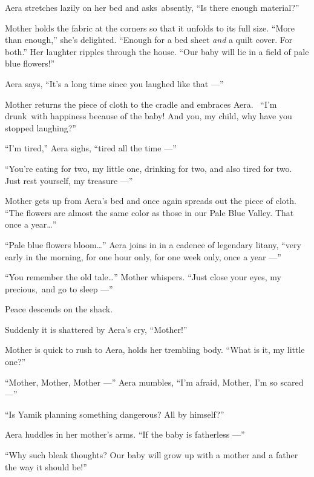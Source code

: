 \documentclass[twoside,11pt,openany]{book}
\begin{document}
Aera stretches lazily on her bed and asks~absently, ``Is there enough material?''

Mother holds the fabric at the corners so that it unfolds to its full size. ``More than
enough,'' she's delighted. ``Enough for a bed sheet \textit{and }a quilt cover.  For
both.'' Her laughter ripples through the house. ``Our baby will lie in a field of pale blue
flowers!''

Aera says, ``It's a long time since you laughed like that ---''

Mother returns the piece of cloth to the cradle and embraces Aera. ~``I'm drunk~with happiness because of
the baby! And you, my child, why have you stopped laughing?''

``I'm tired,'' Aera sighs, ``tired all the time ---''

``You're eating for two, my little one, drinking for two, and also tired for two. Just rest yourself, my
treasure ---''

Mother gets up from Aera's bed and once again spreads out the piece of cloth. ``The flowers are almost the
same color as those in our Pale Blue Valley. That once a year{\ldots}''

``Pale blue flowers bloom{\ldots}'' Aera joins in in a cadence of legendary litany,
``very early in the morning, for one hour only, for one week only, once a year ---''

``You remember the old tale{\ldots}'' Mother whispers. ``Just close your eyes, my
precious,~and go to sleep ---''

Peace descends on the shack.

Suddenly it is shattered by Aera's cry, ``Mother!''

Mother is quick to rush to Aera, holds her trembling body. ``What is it, my little one?''

``Mother, Mother, Mother ---'' Aera mumbles, ``I'm afraid, Mother, I'm so scared
---''

``Is Yamik planning something dangerous? All by himself?''

Aera huddles in her mother's arms. ``If the baby is fatherless ---''

``Why such bleak thoughts? Our baby will grow up with a mother and a father the way it should
be!''


\bigskip

\chapter{}
\end{document}
